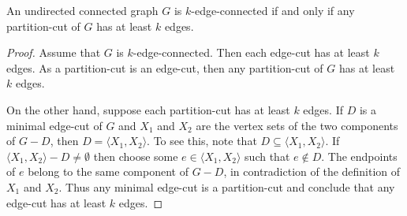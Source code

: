 \begin{proposition}
An undirected connected graph $G$ is $k$-edge-connected if and only if
any partition-cut of $G$ has at least $k$ edges.
\end{proposition}

\begin{proof}
Assume that $G$ is $k$-edge-connected. Then each edge-cut has at least
$k$ edges. As a partition-cut is an edge-cut, then any partition-cut
of $G$ has at least $k$ edges.

On the other hand, suppose each partition-cut has at least $k$
edges. If $D$ is a minimal edge-cut of $G$ and $X_1$ and $X_2$ are the
vertex sets of the two components of $G - D$, then
$D = \langle X_1, X_2 \rangle$. To see this, note that
$D \subseteq \langle X_1, X_2 \rangle$. If
$\langle X_1, X_2 \rangle - D \neq \emptyset$ then choose some
$e \in \langle X_1, X_2 \rangle$ such that $e \notin D$. The endpoints
of $e$ belong to the same component of $G - D$, in contradiction of
the definition of $X_1$ and $X_2$. Thus any minimal edge-cut is a
partition-cut and conclude that any edge-cut has at least $k$ edges.
\end{proof}





